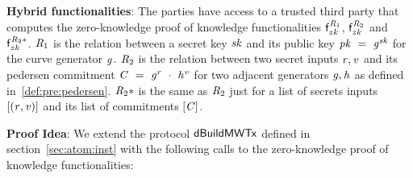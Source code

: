 \textbf{Hybrid functionalities}: The parties have access to a trusted third party that computes the zero-knowledge proof of knowledge functionalities $\mathsf{f}^{\mathit{R}_1}_{zk}$, $\mathsf{f}^{\mathit{R}_2}_{zk}$ and $\mathsf{f}^{\mathit{R}_2*}_{zk}$.
$\mathit{R}_1$ is the relation between a secret key $\mathit{sk}$ and its public key $\mathit{pk} ~=~ \mathit{g}^{\mathit{sk}}$ for the curve generator $\mathit{g}$.
$\mathit{R}_2$ is the relation between two secret inputs $\mathit{r}, \mathit{v}$ and its pedersen commitment $\mathit{C} ~=~ \mathit{g}^{\mathit{r}} ~\cdot~ \mathit{h}^{\mathit{v}}$ for two adjacent generators $\mathit{g}, \mathit{h}$ as defined in~\ref{def:pre:pedersen}.
$\mathit{R}_2*$ is the same as $\mathit{R}_2$ just for a list of secrets inputs $[(\mathit{r}, \mathit{v})]$ and its list of commitments $[\mathit{C}]$.

\textbf{Proof Idea}: We extend the protocol $\mathsf{dBuildMWTx}$ defined in section~\ref{sec:atom:inst} with the following calls to the zero-knowledge proof of knowledge functionalities:

